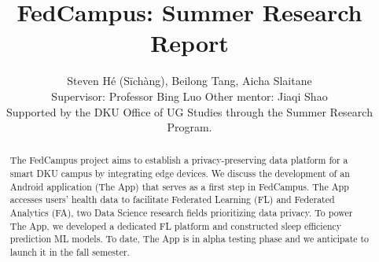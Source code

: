 \documentclass{article}
\title{FedCampus: Summer Research Report}
\author{
    Steven Hé (Sīchàng), Beilong Tang, Aicha Slaitane\\
    Supervisor: Professor Bing Luo\quad
    Other mentor: Jiaqi Shao\\
    Supported by the DKU Office of UG Studies through the Summer Research
    Program.
}
\begin{document}
\maketitle

\begin{abstract}
The FedCampus project aims to establish a privacy-preserving data
platform for a smart DKU campus by integrating edge devices. We discuss
the development of an Android application (The App) that serves as a
first step in FedCampus. The App accesses users' health
data to facilitate Federated Learning (FL) and Federated Analytics (FA),
two Data Science research fields prioritizing data privacy. To power The
App, we developed a dedicated FL platform and constructed sleep
efficiency prediction ML models. To date, The App is in alpha testing
phase and we anticipate to launch it in the fall semester.
\end{abstract}
\end{document}
